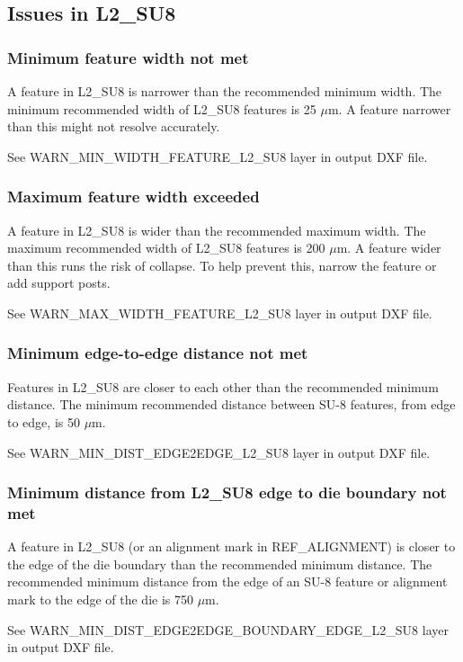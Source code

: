 \documentclass[twoside]{article}
\begin{document}
\subsection{Issues in L2\_SU8}
\subsubsection{Minimum feature width not met}
\par A feature in L2\_SU8 is narrower than the recommended minimum width. The
minimum recommended width of L2\_SU8 features is 25 $\mu$m. A feature narrower
than this might not resolve accurately.  \par See
WARN\_MIN\_WIDTH\_FEATURE\_L2\_SU8 layer in output DXF file.

\subsubsection{Maximum feature width exceeded}
\par A feature in L2\_SU8 is wider than the recommended maximum width. The
maximum recommended width of L2\_SU8 features is 200 $\mu$m. A feature wider
than this runs the risk of collapse. To help prevent this, narrow the feature or
add support posts.  \par See WARN\_MAX\_WIDTH\_FEATURE\_L2\_SU8 layer in output
DXF file.

\subsubsection{Minimum edge-to-edge distance not met}
\par Features in L2\_SU8 are closer to each other than the recommended minimum
distance. The minimum recommended distance between SU-8 features, from edge to
edge, is 50 $\mu$m.  \par See WARN\_MIN\_DIST\_EDGE2EDGE\_L2\_SU8 layer in
output DXF file.

\subsubsection{Minimum distance from L2\_SU8 edge to die boundary not met}
\par A feature in L2\_SU8 (or an alignment mark in REF\_ALIGNMENT) is closer to
the edge of the die boundary than the recommended minimum distance. The
recommended minimum distance from the edge of an SU-8 feature or alignment mark
to the edge of the die is 750 $\mu$m.  \par See
WARN\_MIN\_DIST\_EDGE2EDGE\_BOUNDARY\_EDGE\_L2\_SU8 layer in output DXF file.
\end{document}
